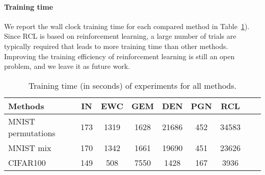 \documentclass{article}
\begin{document}
\paragraph{Training time}
We report the wall clock training time for each compared method in Table~\ref{table1}). Since RCL is based on reinforcement learning, a large number of trials are typically required that leads to more training time than other methods. Improving the training efficiency of reinforcement learning is still an open problem, and we leave it as future work.



\begin{table}[ht]
  \caption{Training time (in seconds) of experiments for all methods.}
  \centering
  \begin{tabular}{lcccccccc}
    \toprule
    Methods &IN&EWC&GEM&DEN&PGN&RCL \\
    \hline
    MNIST permutations&173&1319&1628&21686&452&34583\\
    \hline
    MNIST mix&170&1342&1661&19690&451&23626\\
    \hline
    CIFAR100&149&508&7550&1428&167&3936\\
    \bottomrule
  \end{tabular}
  \label{table1}
\end{table}


\end{document}
